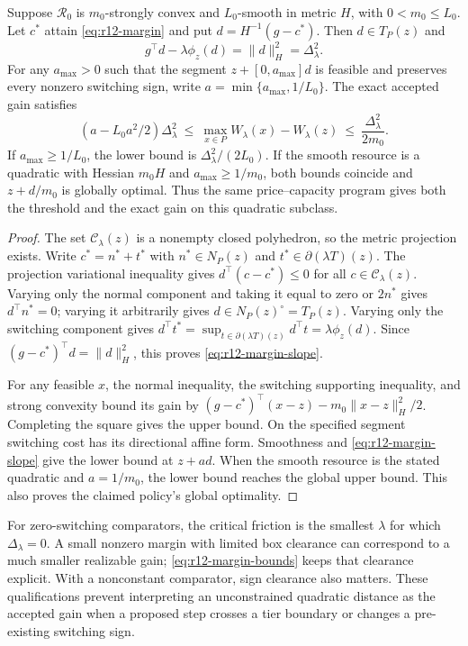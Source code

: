 \begin{theorem}\label{thm:r12-margin}
Suppose $\mathcal R_0$ is $m_0$-strongly convex and $L_0$-smooth in metric $H$, with $0<m_0\leq L_0$. Let $c^*$ attain \eqref{eq:r12-margin} and put $d=H^{-1}(g-c^*)$. Then $d\in T_P(z)$ and
\begin{equation}\label{eq:r12-margin-slope}
 g^\top d-\lambda\phi_z(d)=\|d\|_H^2=\Delta_\lambda^2.
\end{equation}
For any $a_{\max}>0$ such that the segment $z+[0,a_{\max}]d$ is feasible and preserves every nonzero switching sign, write $a=\min\{a_{\max},1/L_0\}$. The exact accepted gain satisfies
\begin{equation}\label{eq:r12-margin-bounds}
 (a-L_0a^2/2)\Delta_\lambda^2
 \ \leq\ \max_{x\in P}W_\lambda(x)-W_\lambda(z)
 \ \leq\ \frac{\Delta_\lambda^2}{2m_0}.
\end{equation}
If $a_{\max}\geq1/L_0$, the lower bound is $\Delta_\lambda^2/(2L_0)$. If the smooth resource is a quadratic with Hessian $m_0H$ and $a_{\max}\geq1/m_0$, both bounds coincide and $z+d/m_0$ is globally optimal. Thus the same price--capacity program gives both the threshold and the exact gain on this quadratic subclass.
\end{theorem}
\begin{proof}
The set $\mathcal C_\lambda(z)$ is a nonempty closed polyhedron, so the metric projection exists. Write $c^*=n^*+t^*$ with $n^*\in N_P(z)$ and $t^*\in\partial(\lambda T)(z)$. The projection variational inequality gives $d^\top(c-c^*)\leq0$ for all $c\in\mathcal C_\lambda(z)$. Varying only the normal component and taking it equal to zero or $2n^*$ gives $d^\top n^*=0$; varying it arbitrarily gives $d\in N_P(z)^\circ=T_P(z)$. Varying only the switching component gives
$d^\top t^*=\sup_{t\in\partial(\lambda T)(z)}d^\top t=\lambda\phi_z(d)$.
Since $(g-c^*)^\top d=\|d\|_H^2$, this proves \eqref{eq:r12-margin-slope}.

For any feasible $x$, the normal inequality, the switching supporting inequality, and strong convexity bound its gain by
$(g-c^*)^\top(x-z)-m_0\|x-z\|_H^2/2$. Completing the square gives the upper bound. On the specified segment switching cost has its directional affine form. Smoothness and \eqref{eq:r12-margin-slope} give the lower bound at $z+ad$. When the smooth resource is the stated quadratic and $a=1/m_0$, the lower bound reaches the global upper bound. This also proves the claimed policy's global optimality.
\end{proof}
For zero-switching comparators, the critical friction is the smallest $\lambda$ for which $\Delta_\lambda=0$. A small nonzero margin with limited box clearance can correspond to a much smaller realizable gain; \eqref{eq:r12-margin-bounds} keeps that clearance explicit. With a nonconstant comparator, sign clearance also matters. These qualifications prevent interpreting an unconstrained quadratic distance as the accepted gain when a proposed step crosses a tier boundary or changes a pre-existing switching sign.

